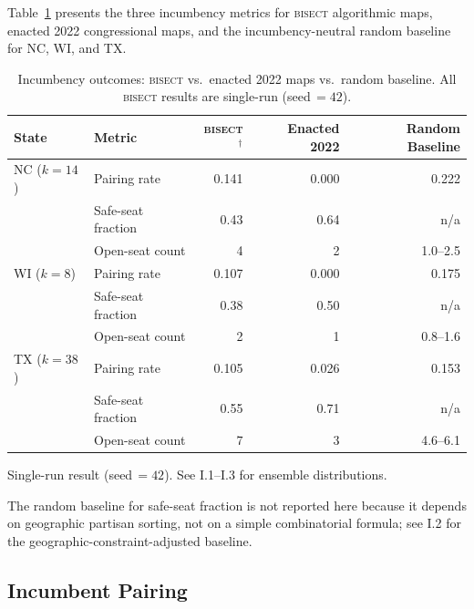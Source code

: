 \label{sec:results}

Table~\ref{tab:incumbency-summary} presents the three incumbency metrics for
\textsc{bisect} algorithmic maps, enacted 2022 congressional maps, and the
incumbency-neutral random baseline for NC, WI, and TX.

\begin{table}[ht]
\centering
\begin{threeparttable}
\caption{Incumbency outcomes: \textsc{bisect} vs.\ enacted 2022 maps vs.\ random
baseline. All \textsc{bisect} results are single-run (seed\,$=42$).}
\label{tab:incumbency-summary}
\begin{tabular}{l l r r r}
\toprule
State & Metric & \textsc{bisect}$^\dagger$ & Enacted 2022 & Random Baseline \\
\midrule
NC ($k=14$) & Pairing rate & 0.141 & 0.000 & 0.222 \\
            & Safe-seat fraction & 0.43  & 0.64  & n/a \\
            & Open-seat count & 4     & 2     & 1.0--2.5 \\
\addlinespace
WI ($k=8$)  & Pairing rate & 0.107 & 0.000 & 0.175 \\
            & Safe-seat fraction & 0.38  & 0.50  & n/a \\
            & Open-seat count & 2     & 1     & 0.8--1.6 \\
\addlinespace
TX ($k=38$) & Pairing rate & 0.105 & 0.026 & 0.153 \\
            & Safe-seat fraction & 0.55  & 0.71  & n/a \\
            & Open-seat count & 7     & 3     & 4.6--6.1 \\
\bottomrule
\end{tabular}
\begin{tablenotes}
\small
\item[$\dagger$] Single-run result (seed\,$=42$). See I.1--I.3 for ensemble distributions.
\item The random baseline for safe-seat fraction is not reported here because it depends
  on geographic partisan sorting, not on a simple combinatorial formula; see I.2 for the
  geographic-constraint-adjusted baseline.
\end{tablenotes}
\end{threeparttable}
\end{table}

\subsection{Incumbent Pairing}

